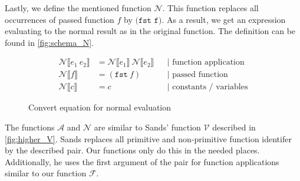 Lastly, we define the mentioned function $\mathcal{N}$.
This function replaces all occurrences of passed function $f$ by $\texttt{(fst f)}$.
As a result, we get an expression evaluating to the normal result as in the original function.
The definition can be found in \autoref{fig:schema_N}.
\begin{figure}
\begin{align*}
  \mathcal{N}\llbracket e_{1}\ e_{2}\rrbracket &= \mathcal{N}\llbracket e_{1}\rrbracket\ \mathcal{N}\llbracket e_{2}\rrbracket &&\text{| function application}\\
  \mathcal{N}\llbracket f\rrbracket &= (\texttt{fst}\ f) &&\text{| passed function}\\
  \mathcal{N}\llbracket c\rrbracket &= c &&\text{| constants / variables}
\end{align*}
\caption{Convert equation for normal evaluation}
\label{fig:schema_N}
\end{figure}

The functions $\mathcal{A}$ and $\mathcal{N}$ are similar to Sands' function $\mathcal{V}$ described in \autoref{fig:higher_V}.
Sands replaces all primitive and non-primitive function identifer by the described pair.
Our functions only do this in the needed places.
Additionally, he uses the first argument of the pair for function applications similar to our function $\mathcal{F}$.

